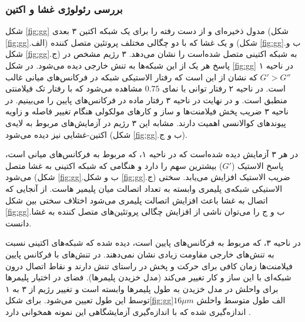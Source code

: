 \subsubsection{بررسی رئولوژی غشا و اکتین}\label{lab:GG}

شکل \ref{fig:gg} مدول ذخیره‌ای و از دست رفته را برای یک شبکه اکتین ۳ بعدی (شکل \ref{fig:gg}.الف) و یک غشا که با دو چگالی مختلف پروتئین متصل کننده (شکل \ref{fig:gg}.ب و شکل \ref{fig:gg}.ج) به شبکه اکتینی متصل شده‌است را  نشان می‌دهد\cite{doi:10.1021/acs.jpcb.7b11491}. ۳ رژیم مشخص در پاسخ هر یک از این  شبکه‌ها به تنش خارجی دیده می‌شود. در شکل \ref{fig:gg} در ناحیه ۱  $G'>G''$ که نشان از این است که رفتار الاستیکی شبکه در فرکانس‌های میانی غالب است. در ناحیه ۲ رفتار توانی با نمای $0.75$ مشاهده می‌شود که با رفتار تک فیلامنتی منطبق است. و در نهایت در ناحیه ۳ رفتار ماده در فرکانس‌های پایین را می‌بینیم. در ناحیه ۳ ضریب پخش فیلامنت‌ها و ساز و کارهای مولکولی هنگام تغییر فاصله و زاویه پیوند‌های کوالانسی اهمیت دارند. مشابه این ۳ رژیم در آزمایش‌های مربوط به لایه‌ی اکتین-غشایی نیز دیده می‌شود (شکل \ref{fig:gg}.ب و ج). 

در هر ۳ آزمایش دیده‌ شده‌است که در ناحیه ۱، که مربوط به فرکانس‌های میانی است، پاسخ الاستیک ($G'$) بیشترین سهم را دارد و هنگامی‌ که شبکه اکتینی به غشا متصل می‌شود (شکل \ref{fig:gg}.ب و شکل \ref{fig:gg}.ج) ضریب الاستیک افزایش می‌یابد. سختی الاستیکی شبکه‌ی پلیمری وابسته به تعداد اتصالت میان پلیمیر هاست. از آنجایی که اتصال به غشا باعث افزایش اتصالت پلیمری می‌شود اختلاف سختی بین شکل \ref{fig:gg}.ب و ج را می‌توان ناشی از افزایش چگالی پروتئین‌های متصل کننده به غشا دانست\cite{doi:10.1021/acs.jpcb.7b11491}.

در ناحیه ۳، که مربوط به فرکانس‌های پایین است، دیده‌ شده که شبکه‌های اکتینی نسبت به تنش‌های خارجی مقاومت زیادی نشان نمی‌دهند. در تنش‌های با فرکانس پایین فیلامنت‌ها زمان کافی برای حرکت و پخش در راستای تنش دارند و نقاط اتصال درون شبکه‌ای با این ساز و کار تغییر می‌کند (مدل خزیدن پلیمر‌ها). فضای در اختیار پلیمر‌ها برای واحلش در مدل خزیدن به طول پلیمر‌ها وابسته است و  تغییر رژیم از ۳ به  ۱ توسط این طول تعیین می‌شود. برای شکل\ref{fig:gg}الف طول متوسط واحلش $16\mu m$ اندازه‌گیری شده که با اندازه‌گیری آزمایشگاهی این نمونه همخوانی دارد \cite{doi:10.1021/acs.jpcb.7b11491}.



